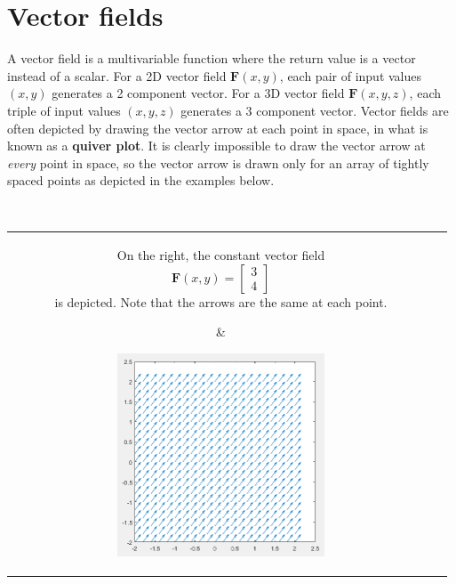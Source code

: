 \documentclass{article}
\begin{document}
\section*{Vector fields}

A vector field is a multivariable function where the return value is a vector instead of a scalar. For a 2D vector field \(\mathbf{F}(x,y)\), each pair of input values \((x, y)\) generates a 2 component vector. For a 3D vector field \(\mathbf{F}(x,y,z)\), each triple of input values \((x, y, z)\) generates a 3 component vector. Vector fields are often depicted by drawing the vector arrow at each point in space, in what is known as a {\bf quiver plot}. It is clearly impossible to draw the vector arrow at \emph{every} point in space, so the vector arrow is drawn only for an array of tightly spaced points as depicted in the examples below.

~

\begin{tabular}{cc}
\parbox{0.5\textwidth}{
On the right, the constant vector field
\[\mathbf{F}(x,y) = \begin{bmatrix} 3 \\ 4 \end{bmatrix}\]
is depicted. Note that the arrows are the same at each point.
} & \parbox{0.5\textwidth}{
\includegraphics[width = 0.5\textwidth]{example_vector_field_1}
}
\end{tabular}
\end{document}

